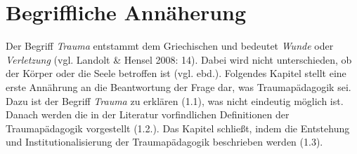 \section{Begriffliche Annäherung}

Der Begriff \textit{Trauma} entstammt dem Griechischen und bedeutet \textit{Wunde} oder \textit{Verletzung} (vgl. Landolt \& Hensel 2008: 14). Dabei wird nicht unterschieden, ob der Körper oder die Seele betroffen ist (vgl. ebd.). Folgendes Kapitel stellt eine erste Annährung an die Beantwortung der Frage dar, was Traumapädagogik sei. Dazu ist der Begriff \textit{Trauma} zu erklären (1.1), was nicht eindeutig möglich ist. Danach werden die in der Literatur vorfindlichen Definitionen der Traumapädagogik vorgestellt (1.2.). Das Kapitel schließt, indem die Entstehung und Institutionalisierung der Traumapädagogik beschrieben werden (1.3).


